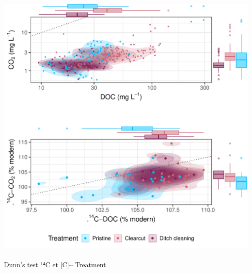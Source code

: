 \documentclass[
  letterpaper,
  DIV=11,
  numbers=noendperiod]{scrartcl}
\makeatletter
\let\oldparagraph\paragraph
\renewcommand{\paragraph}{
    \@ifstar
      \xxxParagraphStar
      \xxxParagraphNoStar
  }
\newcommand{\xxxParagraphStar}[1]{\oldparagraph*{#1}\mbox{}}
\newcommand{\xxxParagraphNoStar}[1]{\oldparagraph{#1}\mbox{}}
\makeatother
\begin{document}
\includegraphics{index_files/figure-pdf/unnamed-chunk-5-1.pdf}

\paragraph{Dunn's test \textbar{} ¹⁴C et {[}C{]}\textasciitilde{}
Treatment}\label{dunns-test-uxb9ux2074c-et-c-treatment}
\end{document}
